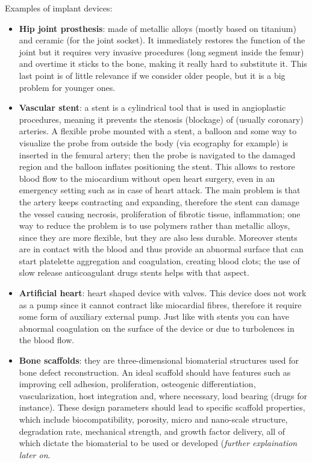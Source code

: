 Examples of implant devices:
\begin{itemize}
  \item \textbf{Hip joint prosthesis}: made of metallic alloys (mostly based on titanium) and ceramic (for the joint socket). It immediately restores the function of the joint but it requires very invasive procedures (long segment inside the femur) and overtime it sticks to the bone, making it really hard to substitute it. This last point is of little relevance if we consider older people, but it is a big problem for younger ones.
  \item \textbf{Vascular stent}: a stent is a cylindrical tool that is used in angioplastic procedures, meaning it prevents the stenosis (blockage) of (usually coronary) arteries. A flexible probe mounted with a stent, a balloon and some way to visualize the probe from outside the body (via ecography for example) is inserted in the femural artery; then the probe is navigated to the damaged region and the balloon inflates positioning the stent. This allows to restore blood flow to the miocardium without open heart surgery, even in an emergency setting such as in case of heart attack. The main problem is that the artery keeps contracting and expanding, therefore the stent can damage the vessel causing necrosis, proliferation of fibrotic tissue, inflammation; one way to reduce the problem is to use polymers rather than metallic alloys, since they are more flexible, but they are also less durable. Moreover stents are in contact with the blood and thus provide an abnormal surface that can start platelette aggregation and coagulation, creating blood clots; the use of slow release anticoagulant drugs stents helps with that aspect. 
  \item \textbf{Artificial heart}: heart shaped device with valves. This device does not work as a pump since it cannot contract like miocardial fibres, therefore it require some form of auxiliary external pump. Just like with stents you can have abnormal coagulation on the surface of the device or due to turbolences in the blood flow.
  \item \textbf{Bone scaffolds}: they are three-dimensional biomaterial structures used for bone defect reconstruction. An ideal scaffold should have features such as improving cell adhesion, proliferation, osteogenic differentiation, vascularization, host integration and, where necessary, load bearing (drugs for instance). These design parameters should lead to specific scaffold properties, which include biocompatibility, porosity, micro and nano-scale structure, degradation rate, mechanical strength, and growth factor delivery, all of which dictate the biomaterial to be used or developed (\textit{further explaination later on}.  %
\end{itemize}


